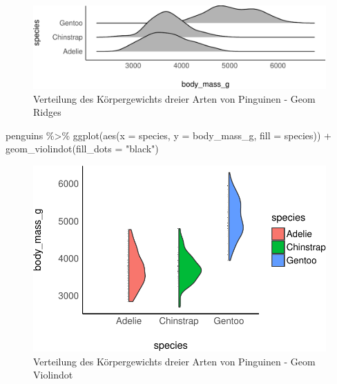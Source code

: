 \documentclass[
  a4paper,
  DIV=11]{scrreprt}
\newenvironment{Shaded}{\begin{snugshade}}{\end{snugshade}}
\newcommand{\AttributeTok}[1]{\textcolor[rgb]{0.40,0.45,0.13}{#1}}
\newcommand{\FunctionTok}[1]{\textcolor[rgb]{0.28,0.35,0.67}{#1}}
\newcommand{\NormalTok}[1]{\textcolor[rgb]{0.00,0.23,0.31}{#1}}
\newcommand{\SpecialCharTok}[1]{\textcolor[rgb]{0.37,0.37,0.37}{#1}}
\newcommand{\StringTok}[1]{\textcolor[rgb]{0.13,0.47,0.30}{#1}}
\theoremstyle{definition}
\theoremstyle{remark}
\begin{document}
\begin{figure}

{\centering \includegraphics{./metrische-AV_files/figure-pdf/fig-penguines2-1.pdf}

}

\caption{\label{fig-penguines2}Verteilung des Körpergewichts dreier
Arten von Pinguinen - Geom Ridges}

\end{figure}

\begin{Shaded}
\begin{Highlighting}[]
\NormalTok{penguins }\SpecialCharTok{\%\textgreater{}\%} 
  \FunctionTok{ggplot}\NormalTok{(}\FunctionTok{aes}\NormalTok{(}\AttributeTok{x =}\NormalTok{ species, }\AttributeTok{y =}\NormalTok{ body\_mass\_g, }\AttributeTok{fill =}\NormalTok{ species)) }\SpecialCharTok{+}
  \FunctionTok{geom\_violindot}\NormalTok{(}\AttributeTok{fill\_dots =} \StringTok{"black"}\NormalTok{)}
\end{Highlighting}
\end{Shaded}

\begin{figure}[H]

{\centering \includegraphics{./metrische-AV_files/figure-pdf/fig-penguines3-1.pdf}

}

\caption{\label{fig-penguines3}Verteilung des Körpergewichts dreier
Arten von Pinguinen - Geom Violindot}

\end{figure}
\end{document}

